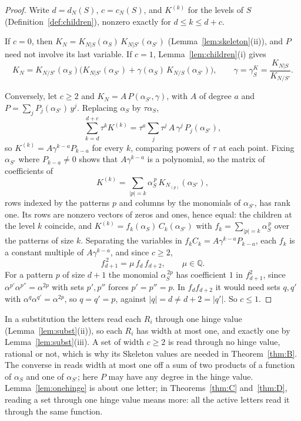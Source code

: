\documentclass[11pt]{article}
\theoremstyle{plain}
\theoremstyle{definition}
\theoremstyle{remark}
\newcommand{\Q}{\mathbb Q}
\begin{document}
\begin{proof}
Write $d=d_N(S)$, $c=c_N(S)$, and $K^{(k)}$ for the levels of $S$ (Definition~\ref{def:children}), nonzero exactly for $d\le k\le d+c$.

If $c=0$, then $K_N=K_{N|S}(\alpha_S)\,K_{N|S'}(\alpha_{S'})$ (Lemma~\ref{lem:skeleton}(ii)), and $P$ need not involve its last variable. If $c=1$, Lemma~\ref{lem:children}(i) gives
\[
K_N=K_{N/S'}(\alpha_S)\Big(K_{N|S'}(\alpha_{S'})+\gamma(\alpha_S)\,K_{N/S}(\alpha_{S'})\Big),\qquad \gamma=\gamma^K_S=\frac{K_{N|S}}{K_{N/S'}}.
\]

Conversely, let $c\ge2$ and $K_N=A\,P(\alpha_{S'},\gamma)$, with $A$ of degree $a$ and $P=\sum_jP_j(\alpha_{S'})\,y^j$. Replacing $\alpha_S$ by $\tau\alpha_S$,
\[
\sum_{k=d}^{d+c}\tau^kK^{(k)}=\tau^a\sum_j\tau^j\,A\,\gamma^j\,P_j(\alpha_{S'}),
\]
so $K^{(k)}=A\gamma^{k-a}P_{k-a}$ for every $k$, comparing powers of $\tau$ at each point. Fixing $\alpha_{S'}$ where $P_{k-a}\neq0$ shows that $A\gamma^{k-a}$ is a polynomial, so the matrix of coefficients of
\[
K^{(k)}=\sum_{|p|=k}\alpha_S^{\,p}\,K_{N_{(p)}}(\alpha_{S'}),
\]
rows indexed by the patterns $p$ and columns by the monomials of $\alpha_{S'}$, has rank one. Its rows are nonzero vectors of zeros and ones, hence equal: the children at the level $k$ coincide, and $K^{(k)}=f_k(\alpha_S)\,C_k(\alpha_{S'})$ with $f_k=\sum_{|p|=k}\alpha_S^{\,p}$ over the patterns of size $k$. Separating the variables in $f_kC_k=A\gamma^{k-a}P_{k-a}$, each $f_k$ is a constant multiple of $A\gamma^{k-a}$, and since $c\ge2$,
\[
f_{d+1}^{\,2}=\mu\,f_d\,f_{d+2},\qquad\mu\in\Q.
\]
For a pattern $p$ of size $d+1$ the monomial $\alpha_S^{\,2p}$ has coefficient $1$ in $f_{d+1}^2$, since $\alpha^{p'}\alpha^{p''}=\alpha^{2p}$ with sets $p',p''$ forces $p'=p''=p$. In $f_df_{d+2}$ it would need sets $q,q'$ with $\alpha^q\alpha^{q'}=\alpha^{2p}$, so $q=q'=p$, against $|q|=d\neq d+2=|q'|$. So $c\le1$.
\end{proof}

In a substitution the letters read each $R_i$ through one hinge value (Lemma~\ref{lem:subst}(ii)), so each $R_i$ has width at most one, and exactly one by Lemma~\ref{lem:subst}(iii). A set of width $c\ge2$ is read through no hinge value, rational or not, which is why its Skeleton values are needed in Theorem~\ref{thm:B}. The converse in \cite[Thm.~18.6, p.~116]{F} reads width at most one off a sum of two products of a function of $\alpha_S$ and one of $\alpha_{S'}$; here $P$ may have any degree in the hinge value. Lemma~\ref{lem:onehinge} is about one letter; in Theorems~\ref{thm:C} and~\ref{thm:D}, reading a set through one hinge value means more: all the active letters read it through the same function.
\end{document}
